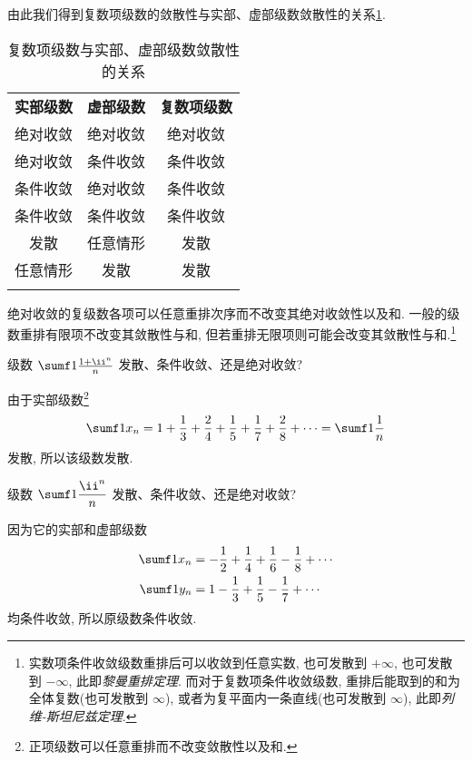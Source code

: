 由此我们得到复数项级数的敛散性与实部、虚部级数敛散性的关系\ref{tab:convergent-re-im}.

\begin{table}[H]
  \centering
  \begin{tabular}{ccc} \topcolorrule
    \bf 实部级数&\bf 虚部级数&\bf 复数项级数\\ \topcolorrule
    绝对收敛&绝对收敛&绝对收敛\\ \midcolorrule
    绝对收敛&条件收敛&条件收敛\\ \midcolorrule
    条件收敛&绝对收敛&条件收敛\\ \midcolorrule
    条件收敛&条件收敛&条件收敛\\ \midcolorrule
    发散&任意情形&发散\\ \midcolorrule
    任意情形&发散&发散\\ \bottomcolorrule
  \end{tabular}
  \caption{复数项级数与实部、虚部级数敛散性的关系}
  \label{tab:convergent-re-im}
\end{table}

绝对收敛的复级数各项可以任意重排次序而不改变其绝对收敛性以及和.
一般的级数重排有限项不改变其敛散性与和, 但若重排无限项则可能会改变其敛散性与和.\footnote{
  实数项条件收敛级数重排后可以收敛到任意实数, 也可发散到 $+\infty$, 也可发散到 $-\infty$, 此即\emph{黎曼重排定理}.
  而对于复数项条件收敛级数, 重排后能取到的和为全体复数(也可发散到 $\infty$), 或者为复平面内一条直线(也可发散到 $\infty$), 此即\emph{列维-斯坦尼兹定理}.
}

\begin{example}
  级数 $\sumf1 \frac{1+\ii^n}n$ 发散、条件收敛、还是绝对收敛?
\end{example}

\begin{solution}
  由于实部级数\footnote{正项级数可以任意重排而不改变敛散性以及和.}
  \[
    \sumf1 x_n
    =1+\frac13+\frac24+\frac15+\frac17+\frac28+\cdots
    =\sumf1 \frac1n
  \]
  发散, 所以该级数发散.
\end{solution}

\begin{example}
  \label{exam:lni}
  级数 $\sumf1 \dfrac{\ii^n}n$ 发散、条件收敛、还是绝对收敛?
\end{example}

\begin{solution}
  因为它的实部和虚部级数
  \begin{align*}
    \sumf1 x_n&=-\half +\frac14+\frac16-\frac18+\cdots\\
    \sumf1 y_n&=1-\frac13+\frac15-\frac17+\cdots
  \end{align*}
  均条件收敛, 所以原级数条件收敛.
\end{solution}

